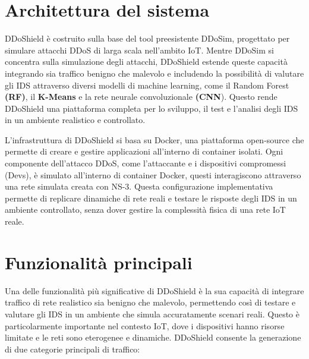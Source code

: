 \section{Architettura del sistema}

DDoShield è costruito sulla base del tool preesistente DDoSim, progettato per simulare attacchi DDoS di larga scala nell'ambito IoT. Mentre DDoSim si concentra sulla simulazione degli attacchi, DDoShield estende queste capacità integrando sia traffico benigno che malevolo e includendo la possibilità di valutare gli IDS attraverso diversi modelli di machine learning, come il Random Forest \textbf{(RF)}, il \textbf{K-Means} e la rete neurale convoluzionale \textbf{(CNN}). Questo rende DDoShield una piattaforma completa per lo sviluppo, il test e l'analisi degli IDS in un ambiente realistico e controllato.\cite{DDoSim}

L'infrastruttura di DDoShield si basa su Docker, una piattaforma open-source che permette di creare e gestire applicazioni all'interno di container isolati. Ogni componente dell'attacco DDoS, come l'attaccante e i dispositivi compromessi (Devs), è simulato all'interno di container Docker, questi interagiscono attraverso una rete simulata creata con NS-3. Questa configurazione implementativa permette di replicare dinamiche di rete reali e testare le risposte degli IDS in un ambiente controllato, senza dover gestire la complessità fisica di una rete IoT reale.

\section{Funzionalità principali}

Una delle funzionalità più significative di DDoShield è la sua capacità di integrare traffico di rete realistico sia benigno che malevolo, permettendo così di testare e valutare gli IDS in un ambiente che simula accuratamente scenari reali. Questo è particolarmente importante nel contesto IoT, dove i dispositivi hanno risorse limitate e le reti sono eterogenee e dinamiche. DDoShield consente la generazione di due categorie principali di traffico:

